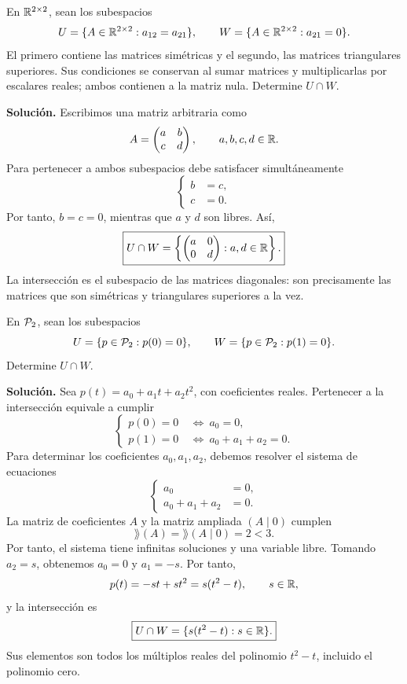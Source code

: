 \documentclass[compacto,10pt]{pubciencias-notas}
\begin{document}
\begin{ejem}
    En $\Mat[\R]{2}{2}$, sean los subespacios
    \[
        U=\{A\in\Mat[\R]{2}{2}:a_{12}=a_{21}\},\qquad
        W=\{A\in\Mat[\R]{2}{2}:a_{21}=0\}.
    \]
    El primero contiene las matrices simétricas y el segundo, las
    matrices triangulares superiores. Sus condiciones se conservan al
    sumar matrices y multiplicarlas por escalares reales; ambos contienen
    a la matriz nula. Determine $U\cap W$.

    \textbf{Solución.} Escribimos una matriz arbitraria como
    \[
        A=\begin{pmatrix}a&b\\c&d\end{pmatrix},\qquad a,b,c,d\in\R.
    \]
    Para pertenecer a ambos subespacios debe satisfacer simultáneamente
    \[
        \left\{\begin{aligned}b&=c,\\c&=0.\end{aligned}\right.
    \]
    Por tanto, $b=c=0$, mientras que $a$ y $d$ son libres. Así,
    \[
        \boxed{U\cap W=
            \left\{\begin{pmatrix}a&0\\0&d\end{pmatrix}:a,d\in\R\right\}.}
    \]
    La intersección es el subespacio de las matrices diagonales:
    son precisamente las matrices que son simétricas y triangulares
    superiores a la vez.
\end{ejem}

\begin{ejem}
    En $\Pol_2$, sean los subespacios
    \[
        U=\{p\in\Pol_2:p(0)=0\},\qquad
        W=\{p\in\Pol_2:p(1)=0\}.
    \]
    Determine $U\cap W$.

    \textbf{Solución.} Sea $p(t)=a_0+a_1t+a_2t^2$, con coeficientes
    reales. Pertenecer a la intersección equivale a cumplir
    \[
        \left\{\begin{aligned}
            p(0)=0&\ \Longleftrightarrow\ a_0=0,\\
            p(1)=0&\ \Longleftrightarrow\ a_0+a_1+a_2=0.
        \end{aligned}\right.
    \]
    Para determinar los coeficientes $a_0,a_1,a_2$, debemos resolver el
    sistema de ecuaciones
    \[
        \left\{\begin{aligned}
            a_0&=0,\\
            a_0+a_1+a_2&=0.
        \end{aligned}\right.
    \]
    La matriz de coeficientes $A$ y la matriz ampliada $(A\mid0)$ cumplen
    \[
        \rang(A)=\rang(A\mid0)=2<3.
    \]
    Por tanto, el sistema tiene infinitas soluciones y una variable libre.
    Tomando $a_2=s$, obtenemos $a_0=0$
    y $a_1=-s$. Por tanto,
    \[
        p(t)=-st+st^2=s(t^2-t),\qquad s\in\R,
    \]
    y la intersección es
    \[
        \boxed{U\cap W=\{s(t^2-t):s\in\R\}.}
    \]
    Sus elementos son todos los múltiplos reales del polinomio $t^2-t$,
    incluido el polinomio cero.
\end{ejem}
\end{document}
